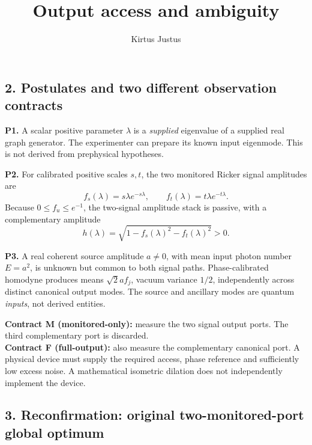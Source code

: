 \documentclass[
  10pt,
  a4paper,
]{article}
\title{Output access and ambiguity}
\author{Kirtus Justus}
\date{}
\begin{document}
\maketitle

\subsection{2. Postulates and two different observation contracts}\label{postulates-and-two-different-observation-contracts}

\textbf{P1.} A scalar positive parameter \(\lambda\) is a \emph{supplied} eigenvalue of a supplied real graph generator. The experimenter can prepare its known input eigenmode. This is not derived from prephysical hypotheses.

\textbf{P2.} For calibrated positive scales \(s,t\), the two monitored Ricker signal amplitudes are \[
 f_s(\lambda)=s\lambda e^{-s\lambda},\qquad f_t(\lambda)=t\lambda e^{-t\lambda}.
\] Because \(0\le f_u\le e^{-1}\), the two-signal amplitude stack is passive, with a complementary amplitude \[
 h(\lambda)=\sqrt{1-f_s(\lambda)^2-f_t(\lambda)^2}>0.
\]

\textbf{P3.} A real coherent source amplitude \(a\ne0\), with mean input photon number \(E=a^2\), is unknown but common to both signal paths. Phase-calibrated homodyne produces means \(\sqrt2 a f_j\), vacuum variance \(1/2\), independently across distinct canonical output modes. The source and ancillary modes are quantum \emph{inputs}, not derived entities.

\textbf{Contract M (monitored-only):} measure the two signal output ports. The third complementary port is discarded.\\
\textbf{Contract F (full-output):} also measure the complementary canonical port. A physical device must supply the required access, phase reference and sufficiently low excess noise. A mathematical isometric dilation does not independently implement the device.

\subsection{3. Reconfirmation: original two-monitored-port global optimum}\label{reconfirmation-original-two-monitored-port-global-optimum}
\end{document}
